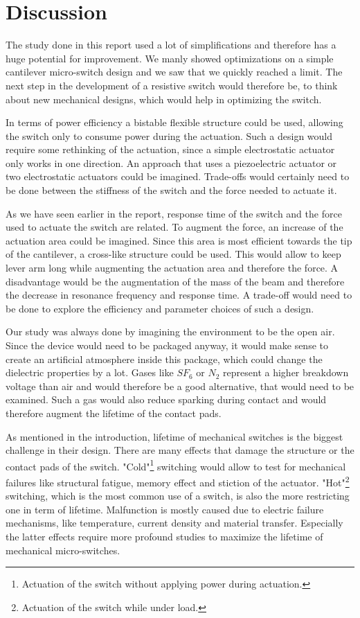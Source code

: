\section{Discussion}
\label{sec:conclusion}
The study done in this report used a lot of simplifications and therefore has a huge potential for improvement.
We manly showed optimizations on a simple cantilever micro-switch design and we saw that we quickly reached a limit.
The next step in the development of a resistive switch would therefore be, to think about new mechanical designs, which would help in optimizing the switch.

In terms of power efficiency a bistable flexible structure could be used, allowing the switch only to consume power during the actuation.
Such a design would require some rethinking of the actuation, since a simple electrostatic actuator only works in one direction.
An approach that uses a piezoelectric actuator or two electrostatic actuators could be imagined.
Trade-offs would certainly need to be done between the stiffness of the switch and the force needed to actuate it.

As we have seen earlier in the report, response time of the switch and the force used to actuate the switch are related.
To augment the force, an increase of the actuation area could be imagined.
Since this area is most efficient towards the tip of the cantilever, a cross-like structure could be used.
This would allow to keep lever arm long while augmenting the actuation area and therefore the force.
A disadvantage would be the augmentation of the mass of the beam and therefore the decrease in resonance frequency and response time.
A trade-off would need to be done to explore the efficiency and parameter choices of such a design.

Our study was always done by imagining the environment to be the open air.
Since the device would need to be packaged anyway, it would make sense to create an artificial atmosphere inside this package, which could change the dielectric properties by a lot.
Gases like $SF_6$ or $N_2$ represent a higher breakdown voltage than air and would therefore be a good alternative, that would need to be examined.
Such a gas would also reduce sparking during contact and would therefore augment the lifetime of the contact pads.

As mentioned in the introduction, lifetime of mechanical switches is the biggest challenge in their design.
There are many effects that damage the structure or the contact pads of the switch.
"Cold"\footnote{Actuation of the switch without applying power during actuation.} switching would allow to test for mechanical failures like structural fatigue, memory effect and stiction of the actuator.
"Hot"\footnote{Actuation of the switch while under load.} switching, which is the most common use of a switch, is also the more restricting one in term of lifetime.
Malfunction is mostly caused due to electric failure mechanisms, like temperature, current density and material transfer.\cite{shaw2012mems}
Especially the latter effects require more profound studies to maximize the lifetime of mechanical micro-switches.

